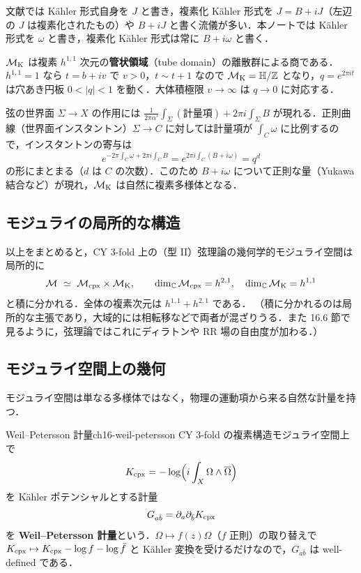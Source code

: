 \begin{note}
文献では K\"ahler 形式自身を $J$ と書き，複素化 K\"ahler 形式を $J=B+iJ$（左辺の $J$ は複素化されたもの）や $B+iJ$ と書く流儀が多い．本ノートでは K\"ahler 形式を $\omega$ と書き，複素化 K\"ahler 形式は常に $B+i\omega$ と書く．
\end{note}

$\mathcal{M}_{\rm K}$ は複素 $h^{1,1}$ 次元の\textbf{管状領域}（tube domain）の離散群による商である．$h^{1,1}=1$ なら $t=b+iv$ で $v>0$，$t\sim t+1$ なので $\mathcal{M}_{\rm K}=\mathbb{H}/\mathbb{Z}$ となり，$q=e^{2\pi it}$ は穴あき円板 $0<|q|<1$ を動く．大体積極限 $v\to\infty$ は $q\to0$ に対応する．

\begin{physbox}[B 場で複素化する理由]
弦の世界面 $\Sigma\to X$ の作用には $\frac{1}{2\pi\alpha'}\int_\Sigma(\text{計量項})+2\pi i\int_\Sigma B$ が現れる．正則曲線（世界面インスタントン）$\Sigma\to C$ に対しては計量項が $\int_C\omega$ に比例するので，インスタントンの寄与は
\[
e^{-2\pi\int_C\omega+2\pi i\int_CB}=e^{2\pi i\int_C(B+i\omega)}=q^{d}
\]
の形にまとまる（$d$ は $C$ の次数）．このため $B+i\omega$ について正則な量（Yukawa 結合など）が現れ，$\mathcal{M}_{\rm K}$ は自然に複素多様体となる．
\end{physbox}

\subsection{モジュライの局所的な構造}

以上をまとめると，CY 3-fold 上の（型 II）弦理論の幾何学的モジュライ空間は局所的に
\begin{equation}
\mathcal{M}\ \simeq\ \mathcal{M}_{\rm cpx}\times\mathcal{M}_{\rm K},\qquad
\dim_{\mathbb{C}}\mathcal{M}_{\rm cpx}=h^{2,1},\quad \dim_{\mathbb{C}}\mathcal{M}_{\rm K}=h^{1,1}
\label{eq:ch16-product}
\end{equation}
と積に分かれる．全体の複素次元は $h^{1,1}+h^{2,1}$ である．
（積に分かれるのは局所的な主張であり，大域的には相転移などで両者が混ざりうる．また 16.6 節で見るように，弦理論ではこれにディラトンや RR 場の自由度が加わる．）

\subsection{モジュライ空間上の幾何}

モジュライ空間は単なる多様体ではなく，物理の運動項から来る自然な計量を持つ．

\begin{mydef}{Weil--Petersson 計量}{ch16-weil-petersson}
CY 3-fold の複素構造モジュライ空間上で
\begin{equation}
K_{\rm cpx}=-\log\Bigl(i\int_X\Omega\wedge\overline{\Omega}\Bigr)
\label{eq:ch16-kahler-potential-cs}
\end{equation}
を K\"ahler ポテンシャルとする計量
\[
G_{a\bar b}=\partial_a\partial_{\bar b}K_{\rm cpx}
\]
を \textbf{Weil--Petersson 計量}という．$\Omega\mapsto f(z)\Omega$（$f$ 正則）の取り替えで $K_{\rm cpx}\mapsto K_{\rm cpx}-\log f-\log\bar f$ と K\"ahler 変換を受けるだけなので，$G_{a\bar b}$ は well-defined である．
\end{mydef}

